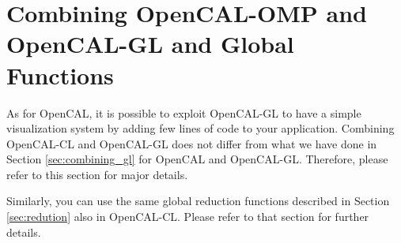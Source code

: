 


\section{Combining OpenCAL-OMP and OpenCAL-GL and  Global Functions}

As for OpenCAL, it is possible to exploit OpenCAL-GL to have a simple
visualization system by adding few lines of code to your
application. Combining OpenCAL-CL and OpenCAL-GL does not differ from
what we have done in Section \ref{sec:combining_gl} for OpenCAL and
OpenCAL-GL. Therefore, please refer to this section for major
details.

Similarly, you can use the same global reduction functions
described in Section \ref{sec:redution} also in OpenCAL-CL.  Please
refer to that section for further details.
